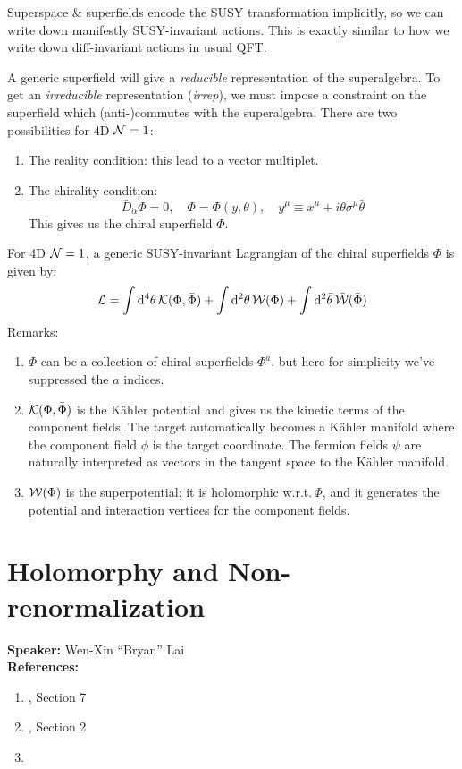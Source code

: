 \documentclass[a4paper
	,10pt
]{article}
\newcommand{\speaker}[1]{\noindent\textbf{Speaker:} #1}
\newcommand{\references}[1]{\noindent\textbf{References:} #1}
\begin{document}
	Superspace \& superfields encode the SUSY transformation implicitly, so we can write down manifestly SUSY-invariant actions. This is exactly similar to how we write down diff-invariant actions in usual QFT.
	
	A generic superfield will give a \textit{reducible} representation of the superalgebra. To get an \textit{irreducible} representation (\textit{irrep}), we must impose a constraint on the superfield which (anti-)commutes with the superalgebra. There are two possibilities for 4D $\mathcal{N} = 1$:
	\begin{enumerate}[noitemsep]
	\item The reality condition: this lead to a vector multiplet.
	\item The chirality condition:
	\begin{equation}
		\bar{D}_{\dot{\alpha}} \Phi = 0,
	\quad
		\Phi = \Phi(y,\theta),
	\quad
		y^\mu \equiv x^\mu
			+ i\theta \sigma^\mu \bar{\theta}
	\end{equation}
	This gives us the chiral superfield $\Phi$. 
	\end{enumerate}
	
	For 4D $\mathcal{N} = 1$, a generic SUSY-invariant Lagrangian of the chiral superfields $\Phi$ is given by:
	\begin{equation}
		\mathcal{L}
		= \int \dd[4]{\theta} \mathcal{K}(\Phi, \bar{\Phi})
			+ \int \dd[2]{\theta}
				\mathcal{W}(\Phi)
			+ \int \dd[2]{\bar{\theta}}
				\bar{\mathcal{W}}(\bar{\Phi})
	\end{equation}
	Remarks:
	\begin{enumerate}
	\item $\Phi$ can be a collection of chiral superfields $\Phi^a$, but here for simplicity we've suppressed the $a$ indices.
	
	\item $\mathcal{K}(\Phi, \bar{\Phi})$ is the K\"ahler potential and gives us the kinetic terms of the component fields. The target automatically becomes a K\"ahler manifold where the component field $\phi$ is the target coordinate. The fermion fields $\psi$ are naturally interpreted as vectors in the tangent space to the K\"ahler manifold. 
	
	\item $\mathcal{W}(\Phi)$ is the superpotential; it is holomorphic w.r.t.\,$\Phi$, and it generates the potential and interaction vertices for the component fields. 
	\end{enumerate}
\section{Holomorphy and Non-renormalization}
	\speaker{Wen-Xin ``Bryan'' Lai}\\
	\references{
	\begin{enumerate}[noitemsep,topsep=0pt]
	\item \textcite{Argyres:1996abc}, Section 7
	\item \textcite{Intriligator:1995au}, Section 2
	\item \textcite{Seiberg:1993vc}
	\end{enumerate}
	}\vspace{.5\baselineskip}
	
\end{document}

